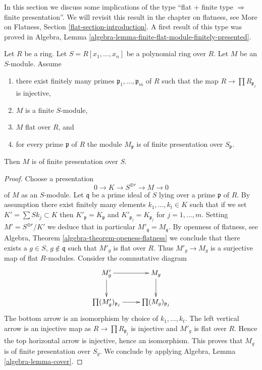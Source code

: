 \noindent
In this section we discuss some implications of the type
``flat $+$ finite type $\Rightarrow$ finite presentation''.
We will revisit this result in the chapter on flatness, see
More on Flatness, Section \ref{flat-section-introduction}.
A first result of this type was proved in
Algebra, Lemma \ref{algebra-lemma-finite-flat-module-finitely-presented}.

\begin{lemma}
\label{lemma-flat-finite-type-finite-presentation-local-module}
Let $R$ be a ring. Let $S = R[x_1, \ldots, x_n]$ be a polynomial
ring over $R$. Let $M$ be an $S$-module.
Assume
\begin{enumerate}
\item there exist finitely many primes $\mathfrak p_1, \ldots, \mathfrak p_m$
of $R$ such that the map $R \to \prod R_{\mathfrak p_j}$ is injective,
\item $M$ is a finite $S$-module,
\item $M$ flat over $R$, and
\item for every prime $\mathfrak p$ of $R$ the module $M_{\mathfrak p}$
is of finite presentation over $S_{\mathfrak p}$.
\end{enumerate}
Then $M$ is of finite presentation over $S$.
\end{lemma}

\begin{proof}
Choose a presentation
$$
0 \to K \to S^{\oplus r} \to M \to 0
$$
of $M$ as an $S$-module. Let $\mathfrak q$ be a prime ideal of $S$
lying over a prime $\mathfrak p$ of $R$. By assumption there exist
finitely many elements $k_1, \ldots, k_t \in K$ such that if we set
$K' = \sum Sk_j \subset K$ then
$K'_{\mathfrak p} = K_{\mathfrak p}$ and
$K'_{\mathfrak p_j} = K_{\mathfrak p_j}$ for $j = 1, \ldots, m$.
Setting $M' = S^{\oplus r}/K'$ we deduce that in particular
$M'_{\mathfrak q} = M_{\mathfrak q}$. By openness of flatness, see
Algebra, Theorem \ref{algebra-theorem-openess-flatness}
we conclude that there exists a $g \in S$, $g \not \in \mathfrak q$
such that $M'_g$ is flat over $R$. Thus $M'_g \to M_g$ is a surjective
map of flat $R$-modules. Consider the commutative diagram
$$
\xymatrix{
M'_g \ar[r] \ar[d] & M_g \ar[d] \\
\prod (M'_g)_{\mathfrak p_j} \ar[r] & \prod (M_g)_{\mathfrak p_j}
}
$$
The bottom arrow is an isomorphism by choice of $k_1, \ldots, k_t$.
The left vertical arrow is an injective map as
$R \to \prod R_{\mathfrak p_j}$ is injective and $M'_g$ is flat over $R$.
Hence the top horizontal arrow is injective, hence an isomorphism.
This proves that $M_g$ is of finite presentation over $S_g$.
We conclude by applying
Algebra, Lemma \ref{algebra-lemma-cover}.
\end{proof}

